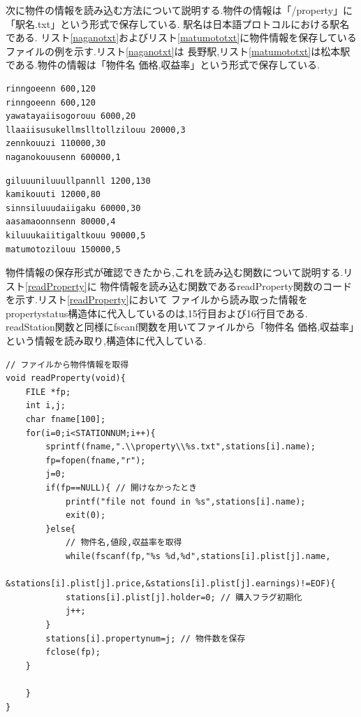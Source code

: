 \documentclass[a4j]{jarticle}
\begin{document}
    次に物件の情報を読み込む方法について説明する.物件の情報は「/property」に「駅名.txt」という形式で保存している.
    駅名は日本語プロトコルにおける駅名である.
    リスト\ref{naganotxt}およびリスト\ref{matumototxt}に物件情報を保存しているファイルの例を示す.リスト\ref{naganotxt}は
    長野駅,リスト\ref{matumototxt}は松本駅である.物件の情報は「物件名 価格,収益率」という形式で保存している.
\begin{lstlisting}[basicstyle=\ttfamily\footnotesize, frame=single,label=naganotxt,caption=/property/nagano.txt]
rinngoeenn 600,120
rinngoeenn 600,120
yawatayaiisogorouu 6000,20 
llaaiisusukellmslltollzilouu 20000,3 
zennkouuzi 110000,30
naganokouusenn 600000,1
\end{lstlisting}  

\begin{lstlisting}[basicstyle=\ttfamily\footnotesize, frame=single,label=matumototxt,caption=/property/matumoto.txt]
giluuuniluuullpannll 1200,130 
kamikouuti 12000,80
sinnsiluuudaiigaku 60000,30
aasamaoonnsenn 80000,4
kiluuukaiitigaltkouu 90000,5
matumotozilouu 150000,5
\end{lstlisting}     

    物件情報の保存形式が確認できたから,これを読み込む関数について説明する.リスト\ref{readProperty}に
    物件情報を読み込む関数であるreadProperty関数のコードを示す.リスト\ref{readProperty}において
    ファイルから読み取った情報をpropertystatus構造体に代入しているのは,15行目および16行目である.
    readStation関数と同様にfscanf関数を用いてファイルから「物件名 価格,収益率」という情報を読み取り,構造体に代入している.
    \begin{lstlisting}[basicstyle=\ttfamily\footnotesize, frame=single,label=readProperty,caption=readProperty関数]
// ファイルから物件情報を取得
void readProperty(void){
    FILE *fp;
    int i,j;
    char fname[100];
    for(i=0;i<STATIONNUM;i++){
        sprintf(fname,".\\property\\%s.txt",stations[i].name);
        fp=fopen(fname,"r");
        j=0;
        if(fp==NULL){ // 開けなかったとき
            printf("file not found in %s",stations[i].name);
            exit(0);
        }else{
            // 物件名,値段,収益率を取得
            while(fscanf(fp,"%s %d,%d",stations[i].plist[j].name,
            &stations[i].plist[j].price,&stations[i].plist[j].earnings)!=EOF){
            stations[i].plist[j].holder=0; // 購入フラグ初期化
            j++;
        }
        stations[i].propertynum=j; // 物件数を保存
        fclose(fp);
    }

    }   
}
                \end{lstlisting}  
\end{document}
